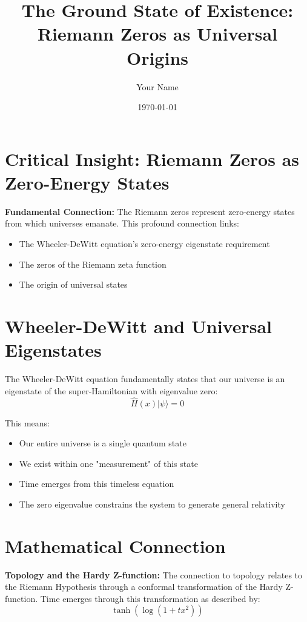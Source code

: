 \documentclass{article}
\begin{document}
\title{The Ground State of Existence: Riemann Zeros as Universal Origins}
\author{Your Name}
\date{\today}
\maketitle

\section{Critical Insight: Riemann Zeros as Zero-Energy States}
\textbf{Fundamental Connection:} The Riemann zeros represent zero-energy states from which universes emanate. This profound connection links:
\begin{itemize}
\item The Wheeler-DeWitt equation's zero-energy eigenstate requirement
\item The zeros of the Riemann zeta function
\item The origin of universal states
\end{itemize}

\section{Wheeler-DeWitt and Universal Eigenstates}
The Wheeler-DeWitt equation fundamentally states that our universe is an eigenstate of the super-Hamiltonian with eigenvalue zero:
\begin{equation}
\hat{H}(x)|\psi\rangle = 0
\end{equation}

This means:
\begin{itemize}
\item Our entire universe is a single quantum state
\item We exist within one "measurement" of this state
\item Time emerges from this timeless equation
\item The zero eigenvalue constrains the system to generate general relativity
\end{itemize}

\section{Mathematical Connection}
\textbf{Topology and the Hardy Z-function:} The connection to topology relates to the Riemann Hypothesis through a conformal transformation of the Hardy Z-function. Time emerges through this transformation as described by:
\begin{equation}
\tanh(\log(1 + tx^2))
\end{equation}
\end{document}
